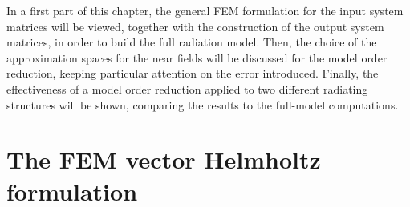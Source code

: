 \par In a first part of this chapter, the general FEM formulation for the input system matrices will be viewed, together with the construction of the output system matrices, in order to build the full radiation model. Then, the choice of the approximation spaces for the near fields will be discussed for the model order reduction, keeping particular attention on the error introduced. Finally, the effectiveness of a model order reduction applied to two different radiating structures will be shown, comparing the results to the full-model computations.

\section{The FEM vector Helmholtz formulation}

